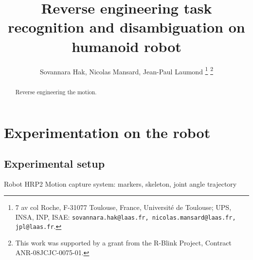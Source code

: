 \documentclass[letterpaper, 10pt, conference]{ieeeconf}      %
\title{\LARGE \bf
Reverse engineering task recognition and disambiguation on humanoid robot
}
\author{Sovannara Hak, Nicolas Mansard, Jean-Paul Laumond%
  \thanks{7 av col Roche, F-31077 Toulouse, France, Universit\'e de Toulouse; UPS, INSA, INP,
    ISAE: {\tt\small sovannara.hak@laas.fr, nicolas.mansard@laas.fr, jpl@laas.fr}.}
  \thanks{This work was supported by a grant from the R-Blink Project, Contract
    ANR-08JCJC-0075-01.}  }
\begin{document}
\maketitle
\thispagestyle{empty}
\pagestyle{empty}


\begin{abstract}
Reverse engineering the motion.
\end{abstract}

\section{Experimentation on the robot}

\subsection{Experimental setup}
Robot HRP2
Motion capture system: markers, skeleton, joint angle trajectory
\end{document}
